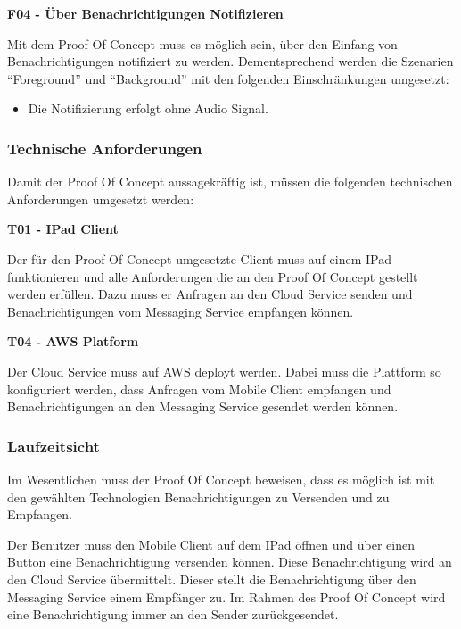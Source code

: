 \textbf{F04 - Über Benachrichtigungen Notifizieren}

Mit dem Proof Of Concept muss es möglich sein, über den Einfang von Benachrichtigungen notifiziert zu werden.
Dementsprechend werden die Szenarien ``Foreground'' und ``Background'' mit den folgenden Einschränkungen umgesetzt:

\begin{itemize}
    \item Die Notifizierung erfolgt ohne Audio Signal.
\end{itemize}

\clearpage
\subsubsection{Technische Anforderungen}

Damit der Proof Of Concept aussagekräftig ist, müssen die folgenden technischen Anforderungen umgesetzt werden:

\textbf{T01 - IPad Client}

Der für den Proof Of Concept umgesetzte Client muss auf einem IPad funktionieren und alle Anforderungen die an den
Proof Of Concept gestellt werden erfüllen.
Dazu muss er Anfragen an den Cloud Service senden und Benachrichtigungen vom Messaging Service empfangen können.

\textbf{T04 - AWS Platform}

Der Cloud Service muss auf AWS deployt werden.
Dabei muss die Plattform so konfiguriert werden, dass Anfragen vom Mobile Client empfangen und Benachrichtigungen an den Messaging Service gesendet werden können.


\subsubsection{Laufzeitsicht}

Im Wesentlichen muss der Proof Of Concept beweisen, dass es möglich ist mit den gewählten Technologien Benachrichtigungen zu Versenden und zu Empfangen.

Der Benutzer muss den Mobile Client auf dem IPad öffnen und über einen Button eine Benachrichtigung versenden können.
Diese Benachrichtigung wird an den Cloud Service übermittelt.
Dieser stellt die Benachrichtigung über den Messaging Service einem Empfänger zu.
Im Rahmen des Proof Of Concept wird eine Benachrichtigung immer an den Sender zurückgesendet.

